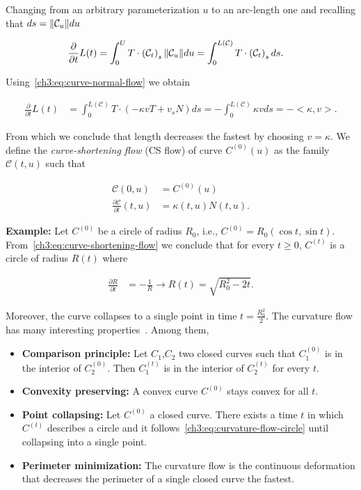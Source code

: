 Changing from an arbitrary parameterization $u$ to an arc-length one and recalling that $ds=\lVert \mathcal{C}_u \rVert  du$

\begin{align*}
	\frac{\partial }{\partial t}L(t) &= \int_{0}^{U}{ T \cdot \left( \mathcal{C}_{t} \right)_s \lVert \mathcal{C}_u \rVert  du} = \int_{0}^{L(\mathcal{C})}{ T \cdot \left( \mathcal{C}_{t} \right)_s ds}. 	
\end{align*}

Using~\cref{ch3:eq:curve-normal-flow} we obtain

\begin{align*}
	\frac{\partial }{\partial t}L(t) &= \int_{0}^{L(\mathcal{C})}{T \cdot (-\kappa vT + v_sN) ds } = - \int_{0}^{L(\mathcal{C})}{\kappa v ds} = -<\kappa,v>.
\end{align*}

From which we conclude that length decreases the fastest by choosing $v=\kappa$. We define the \emph{curve-shortening flow} (CS flow) of curve $C^{(0)}(u)$ as the family $\mathcal{C}(t,u)$ such that

\begin{align}
	\mathcal{C}(0,u) & = C^{(0)}(u) \\
	\frac{\partial \mathcal{C}}{\partial t}(t,u) &= \kappa(t,u) N(t,u).
	\label{ch3:eq:curve-shortening-flow}
\end{align}


\textbf{Example:} Let $C^{(0)}$ be a circle of radius $R_0$, i.e.,  $C^{(0)} = R_0( \cos t, \sin t)$. From~\cref{ch3:eq:curve-shortening-flow} we conclude that for every $t \geq 0$, $C^{(t)}$ is a circle of radius $R(t)$ where

\begin{align}
	\frac{\partial R}{\partial t} &= -\frac{1}{R}  \rightarrow R(t) = \sqrt{R_0^2 - 2t}.
	\label{ch3:eq:curvature-flow-circle}
\end{align}

Moreover, the curve collapses to a single point in time $t=\frac{R_0^2}{2}$. The curvature flow has many interesting properties~\cite{huisken84flow,gage86heat,ecker08heat}. Among them,

\begin{itemize}
	\item[]{\textbf{Comparison principle:} Let $C_1$,$C_2$ two closed curves such that $C_1^{(0)}$ is in the interior of $C_2^{(0)}$. Then $C_1^{(t)}$ is in the interior of $C_2^{(t)}$ for every $t$.}
	\item[]{\textbf{Convexity preserving:} A convex curve $C^{(0)}$ stays convex for all $t$.}
	\item[]{\textbf{Point collapsing:} Let $C^{(0)}$ a closed curve. There exists a time $t$ in which $C^{(t)}$ describes a circle and it follows~\cref{ch3:eq:curvature-flow-circle} until collapsing into a single point.}
	\item[]{\textbf{Perimeter minimization:} The curvature flow is the continuous deformation that decreases the perimeter of a single closed curve the fastest.}
\end{itemize}


